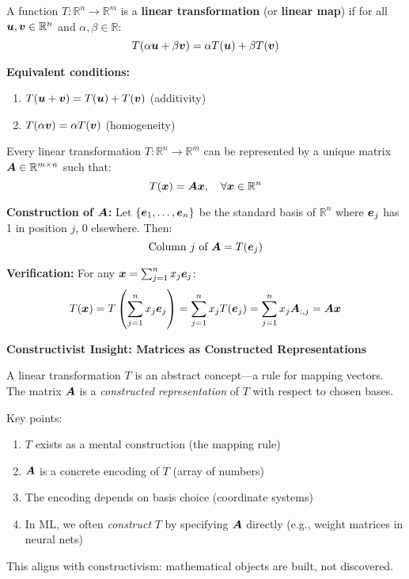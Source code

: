\begin{definition}
    \label{def:linear-transformation}
    A function $T: \mathbb{R}^n \to \mathbb{R}^m$ is a \textbf{linear transformation} (or \textbf{linear map}) if for all $\bm{u}, \bm{v} \in \mathbb{R}^n$ and $\alpha, \beta \in \mathbb{R}$:
    \[
        T(\alpha\bm{u} + \beta\bm{v}) = \alpha T(\bm{u}) + \beta T(\bm{v})
    \]

    \textbf{Equivalent conditions:}
    \begin{enumerate}
        \item $T(\bm{u} + \bm{v}) = T(\bm{u}) + T(\bm{v})$ (additivity)
        \item $T(\alpha\bm{v}) = \alpha T(\bm{v})$ (homogeneity)
    \end{enumerate}
\end{definition}

\begin{theorem}
    \label{thm:matrix-representation}
    Every linear transformation $T: \mathbb{R}^n \to \mathbb{R}^m$ can be represented by a unique matrix $\bm{A} \in \mathbb{R}^{m \times n}$ such that:
    \[
        T(\bm{x}) = \bm{A}\bm{x}, \quad \forall \bm{x} \in \mathbb{R}^n
    \]

    \textbf{Construction of $\bm{A}$:}
    Let $\{\bm{e}_1, \ldots, \bm{e}_n\}$ be the standard basis of $\mathbb{R}^n$ where $\bm{e}_j$ has 1 in position $j$, 0 elsewhere. Then:
    \[
        \text{Column } j \text{ of } \bm{A} = T(\bm{e}_j)
    \]

    \textbf{Verification:}
    For any $\bm{x} = \sum_{j=1}^{n} x_j \bm{e}_j$:
    \[
        T(\bm{x}) = T\left(\sum_{j=1}^{n} x_j \bm{e}_j\right) = \sum_{j=1}^{n} x_j T(\bm{e}_j) = \sum_{j=1}^{n} x_j \bm{A}_{:,j} = \bm{A}\bm{x}
    \]
\end{theorem}

\begin{philobox}
    \textbf{Constructivist Insight: Matrices as Constructed Representations}

    A linear transformation $T$ is an abstract concept—a rule for mapping vectors.
    The matrix $\bm{A}$ is a \textit{constructed representation} of $T$ with
    respect to chosen bases.

    Key points:
    \begin{enumerate}
        \item $T$ exists as a mental construction (the mapping rule)
        \item $\bm{A}$ is a concrete encoding of $T$ (array of numbers)
        \item The encoding depends on basis choice (coordinate systems)
        \item In ML, we often \textit{construct} $T$ by specifying $\bm{A}$ directly (e.g.,
              weight matrices in neural nets)
    \end{enumerate}

    This aligns with constructivism: mathematical objects are built, not
    discovered.
\end{philobox}


